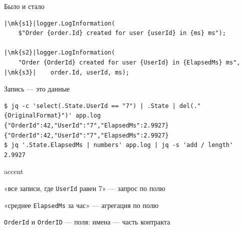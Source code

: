 \documentclass[aspectratio=169,10pt,t]{beamer}
\newcommand{\codesm}{\ttfamily\fontsize{7.6}{9.0}\selectfont}
\newcommand{\termsm}{\ttfamily\fontsize{6.6}{7.9}\selectfont}
\newcommand{\mk}[1]{\tikz[remember picture,overlay]\coordinate (#1) at (0,0.55ex);}
\begin{document}
\begin{frame}[fragile]{Было и стало}
  \slidetop
\begin{lstlisting}[style=csharp,basicstyle=\codesm,escapechar=|]
|\mk{s1}|logger.LogInformation(
    $"Order {order.Id} created for user {userId} in {ms} ms");

|\mk{s2}|logger.LogInformation(
    "Order {OrderId} created for user {UserId} in {ElapsedMs} ms",
|\mk{s3}|    order.Id, userId, ms);
\end{lstlisting}

  \slidegap
\end{frame}

\begin{frame}[fragile]{Запись --- это данные}
  \slidetop

\begin{lstlisting}[style=term,basicstyle=\termsm]
$ jq -c 'select(.State.UserId == "7") | .State | del(."{OriginalFormat}")' app.log
{"OrderId":42,"UserId":"7","ElapsedMs":2.9927}
{"OrderId":42,"UserId":"7","ElapsedMs":2.9927}
$ jq '.State.ElapsedMs | numbers' app.log | jq -s 'add / length'
2.9927
\end{lstlisting}

  \begin{cbul}{accent}
    \item «все записи, где \texttt{UserId} равен 7» --- запрос по полю
    \item «среднее \texttt{ElapsedMs} за час» --- агрегация по полю
    \item \texttt{OrderId} и \texttt{OrderID} ---  поля: имена ---
      часть контракта
  \end{cbul}
\end{frame}
\end{document}
